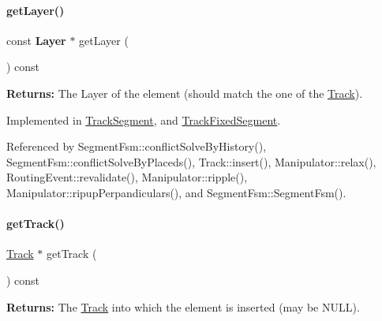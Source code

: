\mbox{\label{classKite_1_1TrackElement_ad96c66549598873bf68c2e18ec7164c1}} 
\paragraph{\texorpdfstring{get\+Layer()}{getLayer()}}
{\footnotesize\ttfamily const \textbf{ Layer} $\ast$ get\+Layer (\begin{DoxyParamCaption}{ }\end{DoxyParamCaption}) const\hspace{0.3cm}{\ttfamily [pure virtual]}}

{\bfseries Returns\+:} The Layer of the element (should match the one of the \mbox{\hyperlink{classKite_1_1Track}{Track}}). 

Implemented in \mbox{\hyperlink{classKite_1_1TrackSegment_ab045567c4f529dca7790d66c17c3084f}{Track\+Segment}}, and \mbox{\hyperlink{classKite_1_1TrackFixedSegment_ab045567c4f529dca7790d66c17c3084f}{Track\+Fixed\+Segment}}.



Referenced by Segment\+Fsm\+::conflict\+Solve\+By\+History(), Segment\+Fsm\+::conflict\+Solve\+By\+Placeds(), Track\+::insert(), Manipulator\+::relax(), Routing\+Event\+::revalidate(), Manipulator\+::ripple(), Manipulator\+::ripup\+Perpandiculars(), and Segment\+Fsm\+::\+Segment\+Fsm().

\mbox{\label{classKite_1_1TrackElement_a3f34f9139b8491a0adb531ac3a904171}} 
\paragraph{\texorpdfstring{get\+Track()}{getTrack()}}
{\footnotesize\ttfamily \mbox{\hyperlink{classKite_1_1Track}{Track}} $\ast$ get\+Track (\begin{DoxyParamCaption}{ }\end{DoxyParamCaption}) const\hspace{0.3cm}{\ttfamily [inline]}}

{\bfseries Returns\+:} The \mbox{\hyperlink{classKite_1_1Track}{Track}} into which the element is inserted (may be {\ttfamily N\+U\+LL}). 

